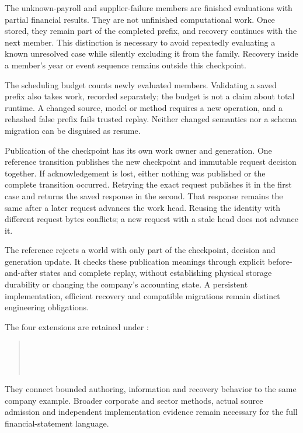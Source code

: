 The unknown-payroll and supplier-failure members are finished evaluations with
partial financial results. They are not unfinished computational work. Once
stored, they remain part of the completed prefix, and recovery continues with
the next member. This distinction is necessary to avoid repeatedly evaluating
a known unresolved case while silently excluding it from the family. Recovery
inside a member's year or event sequence remains outside this checkpoint.

The scheduling budget counts newly evaluated members. Validating a saved
prefix also takes work, recorded separately; the budget is not a claim about
total runtime. A changed source, model or method requires a new operation,
and a rehashed false prefix fails trusted replay. Neither changed semantics
nor a schema migration can be disguised as resume.

Publication of the checkpoint has its own work owner and generation. One
reference transition publishes the new checkpoint and immutable request
decision together. If acknowledgement is lost, either nothing was published
or the complete transition occurred. Retrying the exact request publishes it
in the first case and returns the saved response in the second. That response
remains the same after a later request advances the work head. Reusing the
identity with different request bytes conflicts; a new request with a stale
head does not advance it.

The reference rejects a world with only part of the checkpoint, decision and
generation update. It checks these publication meanings through explicit
before-and-after states and complete replay, without establishing physical
storage durability or changing the company's accounting state. A persistent
implementation, efficient recovery and compatible migrations remain distinct
engineering obligations.

The four extensions are retained under :
\begin{quote}\small
{}\\
\\
\\
\end{quote}
They connect bounded authoring, information and recovery behavior to the same
company example. Broader corporate and
sector methods, actual source admission and independent implementation
evidence remain necessary for the full financial-statement language.



